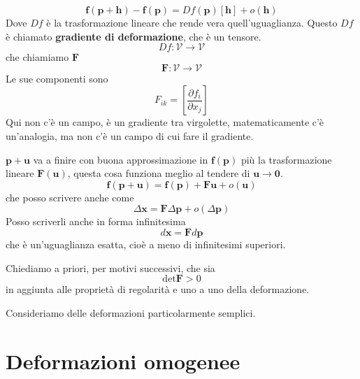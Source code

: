 \documentclass[10pt,a4paper,twoside]{book}
\begin{document}
\begin{equation*}
\mathbf{f}(\mathbf{p} +\mathbf{h}) -\mathbf{f}(\mathbf{p}) =Df(\mathbf{p})[\mathbf{h}] +o(\mathbf{h})
\end{equation*}
Dove $Df$ è la trasformazione lineare che rende vera quell'uguaglianza. Questo $Df$ è chiamato \textbf{gradiente di deformazione}, che è un tensore.
\begin{equation*}
Df:\mathcal{V}\rightarrow \mathcal{V}
\end{equation*}
che chiamiamo $\mathbf{F}$
\begin{equation*}
\mathbf{F} :\mathcal{V}\rightarrow \mathcal{V}
\end{equation*}
Le sue componenti sono
\begin{equation*}
F_{ik} =\left[\frac{\partial f_{i}}{\partial x_{j}}\right]
\end{equation*}
Qui non c'è un campo, è un gradiente tra virgolette, matematicamente c'è un'analogia, ma non c'è un campo di cui fare il gradiente.


$\mathbf{p} +\mathbf{u}$ va a finire con buona approssimazione in $\mathbf{f}(\mathbf{p})$ più la trasformazione lineare $\mathbf{F}(\mathbf{u})$, questa cosa funziona meglio al tendere di $\mathbf{u}\rightarrow \mathbf{0}$.
\begin{equation*}
\mathbf{f}(\mathbf{p} +\mathbf{u}) =\mathbf{f}(\mathbf{p}) +\mathbf{Fu} +o(\mathbf{u})
\end{equation*}
che posso scrivere anche come
\begin{equation*}
\Delta \mathbf{x} =\mathbf{F} \Delta \mathbf{p} +o( \Delta \mathbf{p})
\end{equation*}
Posso scriverli anche in forma infinitesima
\begin{equation*}
\boxed{d\mathbf{x} =\mathbf{F} d\mathbf{p}}
\end{equation*}
che è un'uguaglianza esatta, cioè a meno di infinitesimi superiori.

Chiediamo a priori, per motivi successivi, che sia
\begin{equation*}
\mathrm{det}\mathbf{F}  >0
\end{equation*}
in aggiunta alle proprietà di regolarità e uno a uno della deformazione.

Consideriamo delle deformazioni particolarmente semplici.
\section{Deformazioni omogenee}
\end{document}

